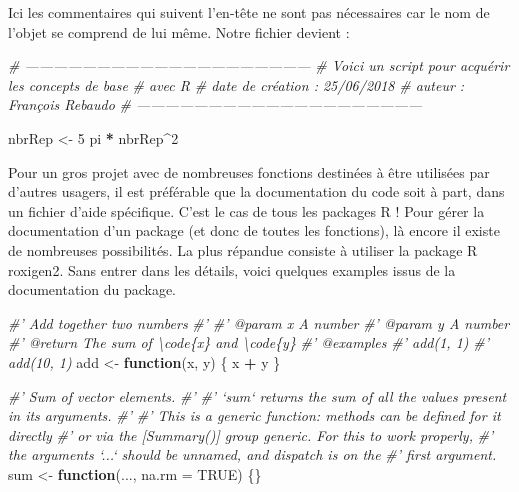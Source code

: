 \documentclass[]{book}
\newenvironment{Shaded}{\begin{snugshade}}{\end{snugshade}}
\newcommand{\DataTypeTok}[1]{\textcolor[rgb]{0.13,0.29,0.53}{#1}}
\newcommand{\DecValTok}[1]{\textcolor[rgb]{0.00,0.00,0.81}{#1}}
\newcommand{\StringTok}[1]{\textcolor[rgb]{0.31,0.60,0.02}{#1}}
\newcommand{\CommentTok}[1]{\textcolor[rgb]{0.56,0.35,0.01}{\textit{#1}}}
\newcommand{\OtherTok}[1]{\textcolor[rgb]{0.56,0.35,0.01}{#1}}
\newcommand{\ControlFlowTok}[1]{\textcolor[rgb]{0.13,0.29,0.53}{\textbf{#1}}}
\newcommand{\OperatorTok}[1]{\textcolor[rgb]{0.81,0.36,0.00}{\textbf{#1}}}
\newcommand{\NormalTok}[1]{#1}
\theoremstyle{definition}
\theoremstyle{definition}
\theoremstyle{definition}
\theoremstyle{remark}
\begin{document}
Ici les commentaires qui suivent l'en-tête ne sont pas nécessaires car
le nom de l'objet se comprend de lui même. Notre fichier devient :

\begin{Shaded}
\begin{Highlighting}[]
\CommentTok{# ------------------------------------------------------------}
\CommentTok{# Voici un script pour acquérir les concepts de base }
\CommentTok{# avec R}
\CommentTok{# date de création : 25/06/2018}
\CommentTok{# auteur : François Rebaudo}
\CommentTok{# ------------------------------------------------------------}

\NormalTok{nbrRep <-}\StringTok{ }\DecValTok{5}
\NormalTok{pi }\OperatorTok{*}\StringTok{ }\NormalTok{nbrRep}\OperatorTok{^}\DecValTok{2}
\end{Highlighting}
\end{Shaded}

Pour un gros projet avec de nombreuses fonctions destinées à être
utilisées par d'autres usagers, il est préférable que la documentation
du code soit à part, dans un fichier d'aide spécifique. C'est le cas de
tous les packages R ! Pour gérer la documentation d'un package (et donc
de toutes les fonctions), là encore il existe de nombreuses
possibilités. La plus répandue consiste à utiliser la package R
roxigen2. Sans entrer dans les détails, voici quelques examples issus de
la documentation du package.

\begin{Shaded}
\begin{Highlighting}[]
\CommentTok{#' Add together two numbers}
\CommentTok{#'}
\CommentTok{#' @param x A number}
\CommentTok{#' @param y A number}
\CommentTok{#' @return The sum of \textbackslash{}code\{x\} and \textbackslash{}code\{y\}}
\CommentTok{#' @examples}
\CommentTok{#' add(1, 1)}
\CommentTok{#' add(10, 1)}
\NormalTok{add <-}\StringTok{ }\ControlFlowTok{function}\NormalTok{(x, y) \{}
\NormalTok{  x }\OperatorTok{+}\StringTok{ }\NormalTok{y}
\NormalTok{\}}
\end{Highlighting}
\end{Shaded}

\begin{Shaded}
\begin{Highlighting}[]
\CommentTok{#' Sum of vector elements.}
\CommentTok{#'}
\CommentTok{#' `sum` returns the sum of all the values present in its arguments.}
\CommentTok{#'}
\CommentTok{#' This is a generic function: methods can be defined for it directly}
\CommentTok{#' or via the [Summary()] group generic. For this to work properly,}
\CommentTok{#' the arguments `...` should be unnamed, and dispatch is on the}
\CommentTok{#' first argument.}
\NormalTok{sum <-}\StringTok{ }\ControlFlowTok{function}\NormalTok{(..., }\DataTypeTok{na.rm =} \OtherTok{TRUE}\NormalTok{) \{\}}
\end{Highlighting}
\end{Shaded}
\end{document}
